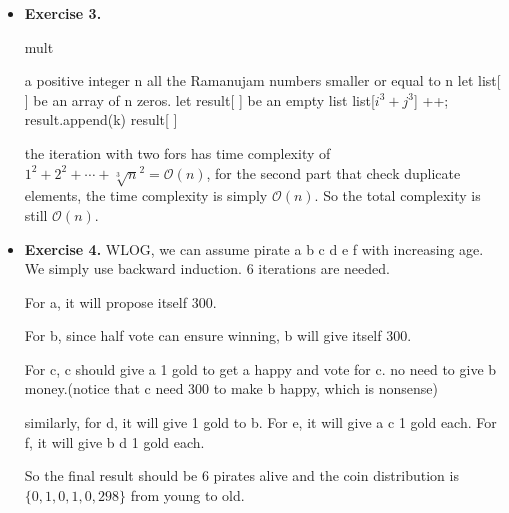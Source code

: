 \documentclass{article}
\begin{document}
\begin{itemize}
(iv) from (i) and (iii), we can get the result.

3. Weak Master Theorem

assume $a\ge 1, b > 1$ two constants. the recurrence relation is $T(n) = aT(\frac{n}{b})+f(n)$. Then we can get the asymptotic bound of T(n) by 

\begin{center}
$T(n)=\left\{\begin{array}{lr}\Theta\left(n^{\log _{b} a}\right) & f(n)=\Theta\left(n^{\log _{b} a}\right) \\ \Theta\left(n^{\log _{b} a}\right) & f(n)=O\left(n^{\log _{b} a-\varepsilon}\right) \\ \Theta(f(n)) & a f(n / b) \leq c f(n)\end{array}\right.$
\end{center}



\item \textbf{Exercise 3.}

\begin{algorithm}[H]  
    \caption{mult}  
    \begin{algorithmic}[1]  
        \Require a positive integer n
        \Ensure all the Ramanujam numbers smaller or equal to n
        \State let list[ ] be an array of n zeros.
        \State let result[ ] be an empty list
        			\State list[$i^3+j^3$] ++;
        		\EndIf
        	\EndFor
        \EndFor
       			result.append(k)
       		\EndIf
        \EndFor
        \State \Return result[ ]
    \end{algorithmic}  
\end{algorithm}

the iteration with two fors has time complexity of $1^{2}+2^{2}+\cdots+\sqrt[3]{n}^{2}=\mathcal{O}(n)$, for the second part that check duplicate elements, the time complexity is simply $\mathcal{O}(n)$. So the total complexity is still $\mathcal{O}(n)$.


\item \textbf{Exercise 4.}
WLOG, we can assume pirate a b c d e f with increasing age. We simply use backward induction. 6 iterations are needed.

For a, it will propose itself 300. 

For b, since half vote can ensure winning, b will give itself 300.

For c, c should give a 1 gold to get a happy and vote for c. no need to give b money.(notice that c need 300 to make b happy, which is nonsense)

similarly, for d, it will give 1 gold to b. For e, it will give a c 1 gold each. For f, it will give b d 1 gold each.

So the final result should be 6 pirates alive and the coin distribution is $\{0,1,0,1,0,298\}$ from young to old.


\end{itemize}

\end{document}
